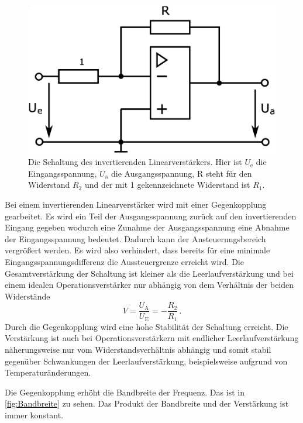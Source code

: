\begin{figure}
    \centering
    \includegraphics[width=0.7\linewidth]{./figures/1_InvLinear.png}
    \caption{Die Schaltung des invertierenden Linearverstärkers. Hier ist $U_\text{e}$ die Eingangsspannung, $U_\text{a}$ die Ausgangsspannung, R steht für den Widerstand $R_2$ und der mit 1 gekennzeichnete Widerstand ist $R_1$. \cite{V51}}
    \label{fig:InvLinear}
\end{figure}

Bei einem invertierenden Linearverstärker wird mit einer Gegenkopplung gearbeitet. Es wird ein Teil der Ausgangsspannung zurück auf den invertierenden Eingang gegeben wodurch eine Zunahme der Ausgangsspannung eine Abnahme der Eingangsspannung bedeutet. Dadurch kann der Ansteuerungsbereich vergrößert werden. Es wird also verhindert, dass bereits für eine minimale Eingangsspannungsdifferenz die Aussteuergrenze erreicht wird. Die Gesamtverstärkung der Schaltung ist kleiner als die Leerlaufverstärkung und bei einem idealen Operationsverstärker nur abhängig von dem Verhältnis der beiden Widerstände
\begin{equation*}
    V = \frac{U_\text{A}}{U_\text{E}} = - \frac{R_2}{R_1} \, .
\end{equation*}
Durch die Gegenkopplung wird eine hohe Stabilität der Schaltung erreicht. Die Verstärkung ist auch bei Operationsverstärkern mit endlicher Leerlaufverstärkung näherungsweise nur vom Widerstandsverhältnis abhängig und somit stabil gegenüber Schwankungen der Leerlaufverstärkung, beispielsweise aufgrund von Temperaturänderungen.

Die Gegenkopplung erhöht die Bandbreite der Frequenz. Das ist in \autoref{fig:Bandbreite} zu sehen. Das Produkt der Bandbreite und der Verstärkung ist immer konstant.

